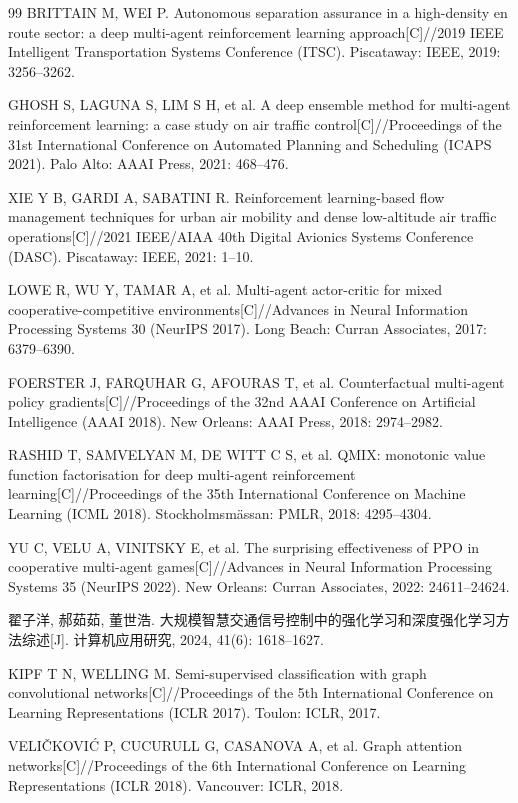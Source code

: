 \documentclass[12pt,a4paper,UTF8]{ctexart}
\begin{document}
\begin{thebibliography}{99}
 BRITTAIN M, WEI P. Autonomous separation assurance in a high-density en route sector: a deep multi-agent reinforcement learning approach[C]//2019 IEEE Intelligent Transportation Systems Conference (ITSC). Piscataway: IEEE, 2019: 3256--3262.

 GHOSH S, LAGUNA S, LIM S H, et al. A deep ensemble method for multi-agent reinforcement learning: a case study on air traffic control[C]//Proceedings of the 31st International Conference on Automated Planning and Scheduling (ICAPS 2021). Palo Alto: AAAI Press, 2021: 468--476.

 XIE Y B, GARDI A, SABATINI R. Reinforcement learning-based flow management techniques for urban air mobility and dense low-altitude air traffic operations[C]//2021 IEEE/AIAA 40th Digital Avionics Systems Conference (DASC). Piscataway: IEEE, 2021: 1--10.

 LOWE R, WU Y, TAMAR A, et al. Multi-agent actor-critic for mixed cooperative-competitive environments[C]//Advances in Neural Information Processing Systems 30 (NeurIPS 2017). Long Beach: Curran Associates, 2017: 6379--6390.

 FOERSTER J, FARQUHAR G, AFOURAS T, et al. Counterfactual multi-agent policy gradients[C]//Proceedings of the 32nd AAAI Conference on Artificial Intelligence (AAAI 2018). New Orleans: AAAI Press, 2018: 2974--2982.

 RASHID T, SAMVELYAN M, DE WITT C S, et al. QMIX: monotonic value function factorisation for deep multi-agent reinforcement learning[C]//Proceedings of the 35th International Conference on Machine Learning (ICML 2018). Stockholmsm\"{a}ssan: PMLR, 2018: 4295--4304.

 YU C, VELU A, VINITSKY E, et al. The surprising effectiveness of PPO in cooperative multi-agent games[C]//Advances in Neural Information Processing Systems 35 (NeurIPS 2022). New Orleans: Curran Associates, 2022: 24611--24624.

 翟子洋, 郝茹茹, 董世浩. 大规模智慧交通信号控制中的强化学习和深度强化学习方法综述[J]. 计算机应用研究, 2024, 41(6): 1618--1627.

 KIPF T N, WELLING M. Semi-supervised classification with graph convolutional networks[C]//Proceedings of the 5th International Conference on Learning Representations (ICLR 2017). Toulon: ICLR, 2017.

 VELI\v{C}KOVI\'C P, CUCURULL G, CASANOVA A, et al. Graph attention networks[C]//Proceedings of the 6th International Conference on Learning Representations (ICLR 2018). Vancouver: ICLR, 2018.


\end{thebibliography}
\end{document}
